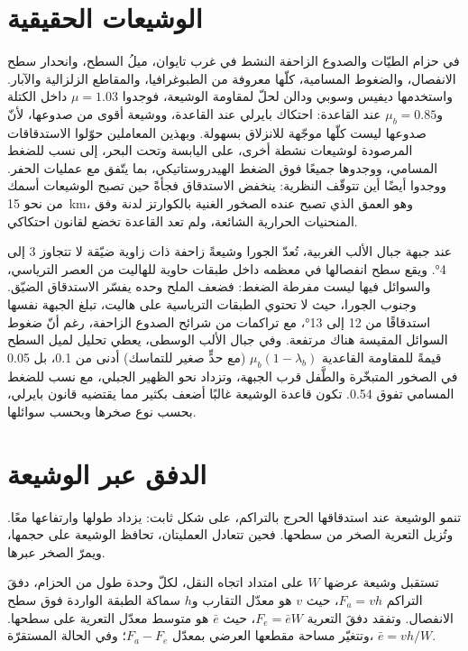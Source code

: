 \section{الوشيعات الحقيقية}\label{sec:b3:orogenic-wedges:real}

في حزام الطيّات والصدوع الزاحفة النشط في غرب تايوان، ميلُ السطح،
وانحدار سطح الانفصال، والضغوط المسامية، كلّها معروفة من الطبوغرافيا،
والمقاطع الزلزالية والآبار. واستخدمها ديفيس وسوبي ودالن لحلّ
 لمقاومة الوشيعة، فوجدوا $\mu = 1.03$
داخل الكتلة و$\mu_b = 0.85$ عند القاعدة: احتكاك بايرلي عند القاعدة، ووشيعة أقوى من صدوعها،
لأنّ صدوعها ليست كلّها موجّهة للانزلاق
بسهولة. وبهذين المعاملين حوّلوا الاستدقاقات المرصودة لوشيعات نشطة أخرى، على اليابسة وتحت البحر،
إلى نسب للضغط المسامي، ووجدوها جميعًا فوق الضغط الهيدروستاتيكي،
بما يتّفق مع عمليات الحفر. ووجدوا أيضًا أين تتوقّف النظرية:
ينخفض الاستدقاق فجأةً حين تصبح الوشيعات أسمك من نحو
\qty{15}{km}، وهو العمق الذي تصبح عنده الصخور الغنية بالكوارتز لدنة
وفق المنحنيات الحرارية الشائعة، ولم تعد القاعدة تخضع لقانون احتكاكي.

عند جبهة جبال الألب الغربية، تُعدّ الجورا وشيعةً زاحفة ذات زاوية ضيّقة
لا تتجاوز 3 إلى \ang{4}. ويقع سطح انفصالها في معظمه داخل طبقات حاوية للهاليت
من العصر الترياسي، والسوائل فيها ليست مفرطة الضغط: فضعف الملح وحده
يفسّر الاستدقاق الضيّق. وجنوب الجورا، حيث لا تحتوي الطبقات الترياسية على هاليت،
تبلغ الجبهة نفسها استدقاقًا من 12 إلى
\ang{13}، مع تراكمات من شرائح الصدوع الزاحفة، رغم أنّ ضغوط السوائل المقيسة
هناك مرتفعة. وفي جبال الألب الوسطى، يعطي تحليل  لميل السطح
قيمةً للمقاومة القاعدية $\mu_b(1 - \lambda_b)$ (مع حدٍّ صغير للتماسك)
أدنى من 0.1، بل 0.05 في الصخور المتبخّرة والطَّفل قرب الجبهة،
وتزداد نحو الظهير الجبلي، مع نسب للضغط المسامي تفوق 0.54. تكون قاعدة الوشيعة غالبًا
أضعف بكثير مما يقتضيه قانون بايرلي، بحسب نوع صخرها
وبحسب سوائلها.

\section{الدفق عبر الوشيعة}\label{sec:b3:orogenic-wedges:flux}

تنمو الوشيعة عند استدقاقها الحرج بالتراكم، على شكل ثابت: يزداد طولها
وارتفاعها معًا. وتُزيل التعرية الصخر من سطحها. فحين
تتعادل العمليتان، تحافظ الوشيعة على حجمها، ويمرّ الصخر عبرها.

\begin{proposition}\label{prop:b3:orogenic-wedges:flux}
تستقبل وشيعة عرضها $W$ على امتداد اتجاه النقل، لكلّ وحدة طول
من الحزام، دفقَ التراكم $F_a = v h$، حيث $v$ هو معدّل التقارب
و$h$ سماكة الطبقة الواردة فوق سطح الانفصال. وتفقد
دفقَ التعرية $F_e = \bar e W$، حيث $\bar e$ هو متوسط معدّل التعرية
على سطحها. وتتغيّر مساحة مقطعها العرضي بمعدّل $F_a -
F_e$؛ وفي الحالة المستقرّة، $\bar e = vh/W$.
\end{proposition}

